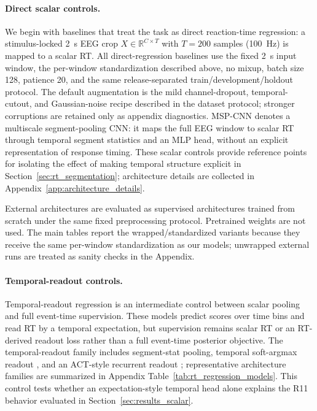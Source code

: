 \documentclass[12pt]{article}
\begin{document}
\paragraph{Direct scalar controls.}
We begin with baselines that treat the task as direct reaction-time regression: a stimulus-locked 2~s EEG crop $X \in \mathbb{R}^{C \times T}$ with $T=200$ samples (100~Hz) is mapped to a scalar RT.
All direct-regression baselines use the fixed 2~s input window, the per-window standardization described above, no mixup, batch size 128, patience 20, and the same release-separated train/development/holdout protocol. The default augmentation is the mild channel-dropout, temporal-cutout, and Gaussian-noise recipe described in the dataset protocol; stronger corruptions are retained only as appendix diagnostics.
MSP-CNN denotes a multiscale segment-pooling CNN: it maps the full EEG window to scalar RT through temporal segment statistics and an MLP head, without an explicit representation of response timing. These scalar controls provide reference points for isolating the effect of making temporal structure explicit in Section~\ref{sec:rt_segmentation}; architecture details are collected in Appendix~\ref{app:architecture_details}.

External architectures are evaluated as supervised architectures trained from scratch under the same fixed preprocessing protocol. Pretrained weights are not used. The main tables report the wrapped/standardized variants because they receive the same per-window standardization as our models; unwrapped external runs are treated as sanity checks in the Appendix.


\paragraph{Temporal-readout controls.}
\label{sec:rt_reg_zoo}

Temporal-readout regression is an intermediate control between scalar pooling and full event-time supervision. These models predict scores over time bins and read RT by a temporal expectation, but supervision remains scalar RT or an RT-derived readout loss rather than a full event-time posterior objective. The temporal-readout family includes segment-stat pooling, temporal soft-argmax readout \citep{nibali2018dsnt}, and an ACT-style recurrent readout \citep{graves2016act,perez2018film}; representative architecture families are summarized in Appendix Table~\ref{tab:rt_regression_models}. This control tests whether an expectation-style temporal head alone explains the R11 behavior evaluated in Section~\ref{sec:results_scalar}.
\end{document}
